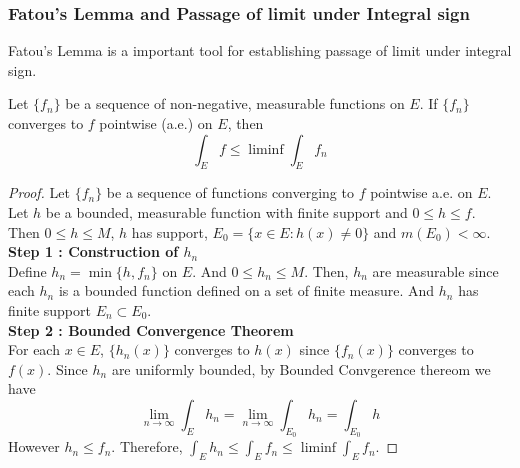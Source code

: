 \subsubsection{Fatou's Lemma and Passage of limit under Integral sign}
	Fatou's Lemma is a important tool for establishing passage of limit under integral sign.
\begin{lemma}[Fatou]
	Let $\{ f_n \}$ be a sequence of non-negative, measurable functions on $E$.
	If $\{ f_n \}$ converges to $f$ pointwise (a.e.) on $E$, then $$\int_E f \le \liminf \int_E f_n$$
\end{lemma}
\begin{proof}
	Let $\{ f_n \}$ be a sequence of functions converging to $f$ pointwise a.e. on $E$.
	Let $h$ be a bounded, measurable function with finite support and $0 \le h \le f$.
	Then $0 \le h \le M$, $h$ has support, $E_0 = \{ x \in E : h(x) \ne 0 \}$ and $m(E_0) < \infty$.\\

	\textbf{Step 1 : Construction of $h_n$}\\
	Define $h_n = \min \{ h,f_n \}$ on $E$.
	And $0 \le h_n \le M$.
	Then, $h_n$ are measurable since each $h_n$ is a bounded function defined on a set of finite measure.
	And $h_n$ has finite support $E_n \subset E_0$.\\

	\textbf{Step 2 : Bounded Convergence Theorem}\\
	For each $x \in E$, $\{ h_n(x) \}$ converges to $h(x)$ since $\{ f_n(x) \}$ converges to $f(x)$.
	Since $h_n$ are uniformly bounded, by Bounded Convgerence thereom we have
	$$ \lim_{n \to \infty} \int_E h_n = \lim_{n \to \infty} \int_{E_0} h_n = \int_{E_0} h $$
	However $h_n \le f_n$.
	Therefore, $\displaystyle \int_E h_n \le \int_E f_n \le \liminf \int_E f_n$.
\end{proof}

